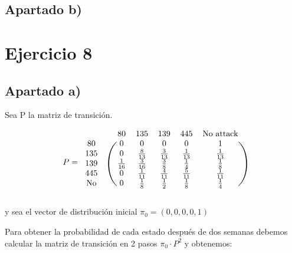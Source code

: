 \documentclass[11pt]{article}
\begin{document}

\subsection*{Apartado b)}


\section{Ejercicio 8}

\subsection*{Apartado a)}

Sea P la matriz de transición.

\begin{equation*}
  P = 
  \begin{blockarray}{ccccccc}
    & & 80 & 135 & 139 & 445 & \text{No attack} \\
    \begin{block}{cc(ccccc)}
      80        & & 0            & 0            & 0            & 0            & 1 \\
      135       & & 0            & \frac{8}{13} & \frac{3}{13} & \frac{1}{13} & \frac{1}{13} \\
      139       & & \frac{1}{16} & \frac{3}{16} & \frac{3}{8}  & \frac{1}{4}  & \frac{1}{8} \\
      445       & & 0            & \frac{1}{11} & \frac{4}{11} & \frac{5}{11} & \frac{1}{11} \\
      \text{No} & & 0            & \frac{1}{8}  & \frac{1}{2}  & \frac{1}{8}  & \frac{1}{4} \\
    \end{block}
  \end{blockarray}
\end{equation*}

y sea el vector de distribución inicial $\pi_0 = (0, 0, 0, 0, 1)$

Para obtener la probabilidad de cada estado después de dos semanas debemos calcular
la matriz de transición en 2 pasos $\pi_0 \cdot P^2$ y obtenemos:
\end{document}
